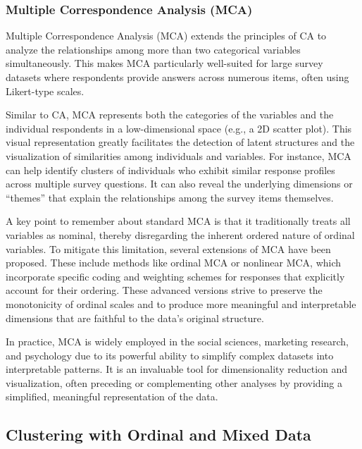 \documentclass[
  letterpaper,
  DIV=11,
  numbers=noendperiod]{scrartcl}
\begin{document}
\hypertarget{multiple-correspondence-analysis-mca}{%
\subsubsection{Multiple Correspondence Analysis
(MCA)}\label{multiple-correspondence-analysis-mca}}

Multiple Correspondence Analysis (MCA) extends the principles of CA to
analyze the relationships among more than two categorical variables
simultaneously. This makes MCA particularly well-suited for large survey
datasets where respondents provide answers across numerous items, often
using Likert-type scales.

Similar to CA, MCA represents both the categories of the variables and
the individual respondents in a low-dimensional space (e.g., a 2D
scatter plot). This visual representation greatly facilitates the
detection of latent structures and the visualization of similarities
among individuals and variables. For instance, MCA can help identify
clusters of individuals who exhibit similar response profiles across
multiple survey questions. It can also reveal the underlying dimensions
or ``themes'' that explain the relationships among the survey items
themselves.

A key point to remember about standard MCA is that it traditionally
treats all variables as nominal, thereby disregarding the inherent
ordered nature of ordinal variables. To mitigate this limitation,
several extensions of MCA have been proposed. These include methods like
ordinal MCA or nonlinear MCA, which incorporate specific coding and
weighting schemes for responses that explicitly account for their
ordering. These advanced versions strive to preserve the monotonicity of
ordinal scales and to produce more meaningful and interpretable
dimensions that are faithful to the data's original structure.

In practice, MCA is widely employed in the social sciences, marketing
research, and psychology due to its powerful ability to simplify complex
datasets into interpretable patterns. It is an invaluable tool for
dimensionality reduction and visualization, often preceding or
complementing other analyses by providing a simplified, meaningful
representation of the data.

\hypertarget{clustering-with-ordinal-and-mixed-data}{%
\subsection{Clustering with Ordinal and Mixed
Data}\label{clustering-with-ordinal-and-mixed-data}}
\end{document}
